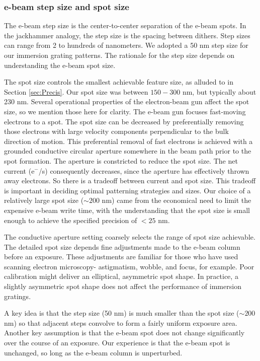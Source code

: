 \documentclass[]{spie}  %
\begin{document}
\subsubsection{e-beam step size and spot size}
The e-beam step size is the center-to-center separation of the e-beam spots.  In the jackhammer analogy, the step size is the spacing between dithers.  Step sizes can range from 2 to hundreds of nanometers.  We adopted a 50 nm step size for our immersion grating patterns.  The rationale for the step size depends on understanding the e-beam spot size.  

The spot size controls the smallest achievable feature size, as alluded to in Section \ref{sec:Precis}.  Our spot size was between $150-300$ nm, but typically about 230 nm.  Several operational properties of the electron-beam gun affect the spot size, so we mention those here for clarity.  The e-beam gun focuses fast-moving electrons to a spot.  The spot size can be decreased by preferentially removing those electrons with large velocity components perpendicular to the bulk direction of motion.  This preferential removal of fast electrons is achieved with a grounded conductive circular aperture somewhere in the beam path prior to the spot formation.  The aperture is constricted to reduce the spot size.  The net current (e$^-$/s) consequently decreases, since the aperture has effectively thrown away electrons.  So there is a tradeoff between current and spot size.  This tradeoff is important in deciding optimal patterning strategies and sizes.  Our choice of a relatively large spot size ($\sim 200$ nm) came from the economical need to limit the expensive e-beam write time, with the understanding that the spot size is small enough to achieve the specified precision of $< 25$ nm.

The conductive aperture setting coarsely selects the range of spot size achievable.  The detailed spot size depends fine adjustments made to the e-beam column before an exposure.  These adjustments are familiar for those who have used scanning electron microscopy- astigmatism, wobble, and focus, for example.  Poor calibration might deliver an elliptical, asymmetric spot shape.  In practice, a slightly asymmetric spot shape does not affect the performance of immersion gratings.

A key idea is that the step size (50 nm) is much smaller than the spot size ($\sim200$ nm) so that adjacent steps convolve to form a fairly uniform exposure area.  Another key assumption is that the e-beam spot does not change significantly over the course of an exposure.  Our experience is that the e-beam spot is unchanged, so long as the e-beam column is unperturbed.
\end{document}
